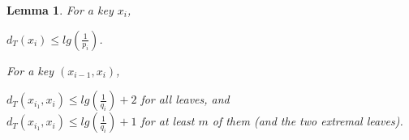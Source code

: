 \documentclass[letterpaper,12pt,titlepage,oneside,final]{book}
\theoremstyle{plain}
\newtheorem{lem}[thm]{Lemma}
\begin{document}
\begin{lem} \label{451}
For a key $x_i$,
\begin{center} $d_T(x_i) \leq lg(\frac{1}{p_i})$. \end{center}
For a key $(x_{i-1},x_i)$,
\begin{center} $d_T(x_{i_1},x_i) \leq lg(\frac{1}{q_i}) + 2$ for all leaves, and\\
 $d_T(x_{i_1},x_i) \leq lg(\frac{1}{q_i}) + 1$ for at least $m$ of them (and the two extremal leaves). \end{center}
  
\begin{center}

\end{center}

\end{lem}
\end{document}
